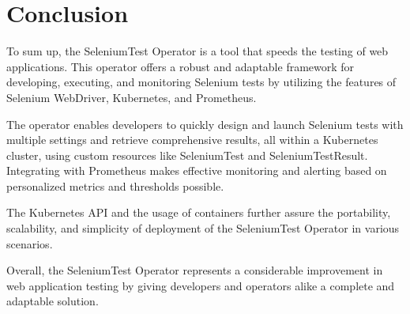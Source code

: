 \chapter{Conclusion}
\label{ch:sum}

To sum up, the SeleniumTest Operator is a tool that speeds the testing of web applications. This operator offers a robust and adaptable framework for developing, executing, and monitoring Selenium tests by utilizing the features of Selenium WebDriver, Kubernetes, and Prometheus.

The operator enables developers to quickly design and launch Selenium tests with multiple settings and retrieve comprehensive results, all within a Kubernetes cluster, using custom resources like SeleniumTest and SeleniumTestResult. Integrating with Prometheus makes effective monitoring and alerting based on personalized metrics and thresholds possible.

The Kubernetes API and the usage of containers further assure the portability, scalability, and simplicity of deployment of the SeleniumTest Operator in various scenarios.

Overall, the SeleniumTest Operator represents a considerable improvement in web application testing by giving developers and operators alike a complete and adaptable solution.